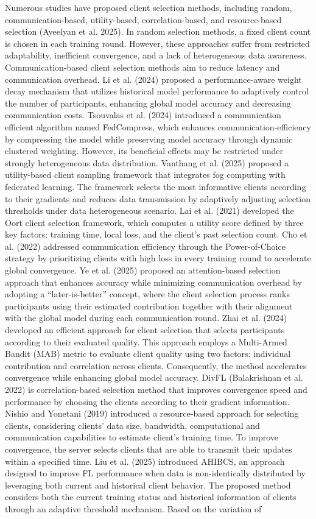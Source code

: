 \documentclass[pdflatex,sn-mathphys-num,oneside]{sn-jnl}%
\theoremstyle{thmstyleone}%
\theoremstyle{thmstyletwo}%
\theoremstyle{thmstylethree}%
\begin{document}
Numerous studies have proposed client selection methods, including random, communication-based, utility-based, correlation-based, and resource-based selection (Ayeelyan et al. 2025). In random selection methods, a fixed client count is chosen in each training round. However, these approaches suffer from restricted adaptability, inefficient convergence, and a lack of heterogeneous data awareness. Communication-based client selection methods aim to reduce latency and communication overhead. Li et al. (2024) proposed a performance-aware weight decay mechanism that utilizes historical model performance to adaptively control the number of participants, enhancing global model accuracy and decreasing communication costs. Tsouvalas et al. (2024) introduced a communication efficient algorithm named FedCompress, which enhances communication-efficiency by compressing the model while preserving model accuracy through dynamic clustered weighting. However, its beneficial effects may be restricted under strongly heterogeneous data distribution. Vanthang et al. (2025) proposed a utility-based client sampling framework that integrates fog computing with federated learning. The framework selects the most informative clients according to their gradients and reduces data transmission by adaptively adjusting selection thresholds under data heterogeneous scenario. Lai et al. (2021) developed the Oort client selection framework, which computes a utility score defined by three key factors: training time, local loss, and the client's past selection count. Cho et al. (2022) addressed communication efficiency through the Power-of-Choice strategy by prioritizing clients with high loss in every training round to accelerate global convergence. Ye et al. (2025) proposed an attention-based selection approach that enhances accuracy while minimizing communication overhead by adopting a “later-is-better” concept, where the client selection process ranks participants using their estimated contribution together with their alignment with the global model during each communication round. Zhai et al. (2024) developed an efficient approach for client selection that selects participants according to their evaluated quality. This approach employs a Multi-Armed Bandit (MAB) metric to evaluate client quality using two factors: individual contribution and correlation across clients. Consequently, the method accelerates convergence while enhancing global model accuracy. DivFL (Balakrishnan et al. 2022) is correlation-based selection method that improves convergence speed and performance by choosing the clients according to their gradient information. Nishio and Yonetani (2019) introduced a resource-based approach for selecting clients, considering clients’ data size, bandwidth, computational and communication capabilities to estimate client’s training time. To improve convergence, the server selects clients that are able to transmit their updates within a specified time. Liu et al. (2025) introduced AHIBCS, an approach designed to improve FL performance when data is non-identically distributed by leveraging both current and historical client behavior. The proposed method considers both the current training status and historical information of clients through an adaptive threshold mechanism. Based on the variation of 
\end{document}
